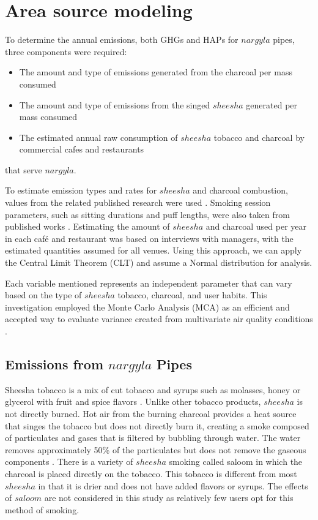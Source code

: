 \section{Area source modeling}
To determine the annual emissions, both GHGs and HAPs for $nargyla$ pipes, three components were required: 
\begin{itemize}
	\item The amount and type of emissions generated from the charcoal per mass consumed
	\item The amount and type of emissions from the singed $sheesha$ generated per mass consumed
	\item The estimated annual raw consumption of $sheesha$ tobacco and charcoal by commercial cafes and restaurants 
\end{itemize}
\noindent
that serve $nargyla$. 

To estimate emission types and rates for $sheesha$ and charcoal combustion, values from the related published research were used \citep{Akagi2011, Bhattacharya2002, Paciornik2006, Sepetdjian2010, USEPA1995}.  Smoking session parameters, such as sitting durations and puff lengths, were also taken from published works \citep{Eissenberg2009, Fromme2009, Mulla2015}.  Estimating the amount of $sheesha$ and charcoal used per year in each café and restaurant was based on interviews with managers, with the estimated quantities assumed for all venues. Using this approach, we can apply the Central Limit Theorem (CLT) and assume a Normal distribution for analysis.  

Each variable mentioned represents an independent parameter that can vary based on the type of $sheesha$ tobacco, charcoal, and user habits.  This investigation employed the Monte Carlo Analysis (MCA) as an efficient and accepted way to evaluate variance created from multivariate air quality conditions \citep{Freeman2017a, McVoy1979, Tan2014}.  

\subsection{Emissions from $nargyla$ Pipes}

Sheesha tobacco is a mix of cut tobacco and syrups such as molasses, honey or glycerol with fruit and spice flavors \citep{Chaouachi2009}.  Unlike other tobacco products, $sheesha$ is not directly burned. Hot air from the burning charcoal provides a heat source that singes the tobacco but does not directly burn it, creating a smoke composed of particulates and gases \citep{Daher2010} that is filtered by bubbling through water.  The water removes approximately 50\% of the particulates but does not remove the gaseous components \citep{Becquemin2008}. There is a variety of $sheesha$ smoking called saloom in which the charcoal is placed directly on the tobacco. This tobacco is different from most $sheesha$ in that it is drier and does not have added flavors or syrups. The effects of $saloom$ are not considered in this study as relatively few users opt for this method of smoking.

